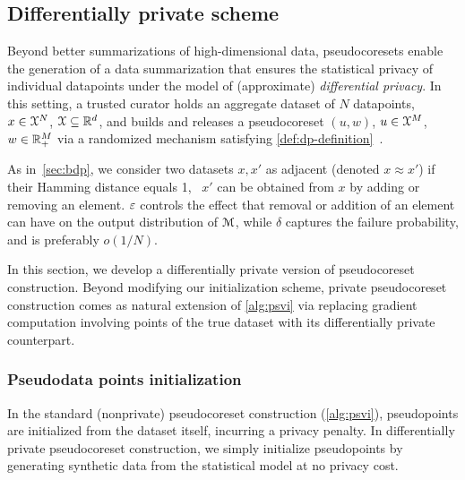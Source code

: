 \subsection{Differentially private scheme}
\label{sec:dp-pseudocoresets}

Beyond better summarizations of high-dimensional data, pseudocoresets enable the 
generation of a data summarization that ensures the statistical privacy of individual datapoints under the model of (approximate) \emph{differential privacy}. In this setting, a trusted
 curator holds an aggregate dataset of $N$ datapoints, $x\in\mathcal{X}^N$, $\mathcal{X}\subseteq \mathbb{R}^d$, and 
builds and releases a pseudocoreset $(u, w)$, $u\in\mathcal{X}^M$, $w\in\mathbb{R}_+^M$ via
a randomized mechanism satisfying \cref{def:dp-definition}~\citep{dwork06, ourdata}.

As in~\cref{sec:bdp}, we consider two datasets $x, x'$ as adjacent (denoted 
$ x \approx x' $) if their Hamming distance equals 1, \ie~$ x' $ can be obtained from $ x $ by adding or removing an
element.  $ \varepsilon $ controls the effect that removal or addition of an element
can have on the output distribution of $\mathcal{M}$, while %
$ \delta $
captures the failure probability, 
and is preferably $ o(1/N)$. 

In this section, we develop a differentially private version of pseudocoreset construction.
Beyond modifying our initialization scheme, private pseudocoreset
construction comes as natural extension of \cref{alg:psvi}
 via replacing gradient computation involving points of the
true dataset with its differentially private counterpart. 


\subsubsection{Pseudodata points initialization}
\label{sec:pseudo-points-initilization}

In the standard (nonprivate) pseudocoreset construction (\cref{alg:psvi}), pseudopoints are initialized from the dataset itself,
incurring a privacy penalty. In differentially private pseudocoreset construction,
we simply initialize pseudopoints by generating synthetic data from the statistical model
at no privacy cost.



